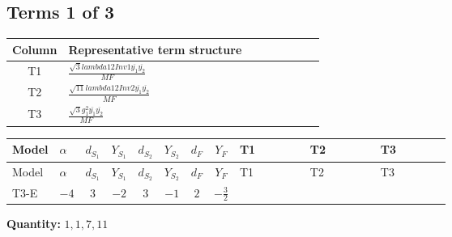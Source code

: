\documentclass[8pt]{article}
\begin{document}
\begin{landscape}
\subsection*{Terms 1 of 3}
\begin{center}
\begin{tabular}{@{}c >{\raggedright\arraybackslash}p{0.82\linewidth}@{}}
\toprule
Column & Representative term structure \\
\midrule
T1 & \(\displaystyle \frac{\sqrt{3} lambda12Inv1 \overline{y_{1}} \overline{y_{2}}}{MF}\) \\
\midrule
T2 & \(\displaystyle \frac{\sqrt{11} lambda12Inv2 \overline{y_{1}} \overline{y_{2}}}{MF}\) \\
\midrule
T3 & \(\displaystyle \frac{\sqrt{3} g_{1}^{2} \overline{y_{1}} \overline{y_{2}}}{MF}\) \\
\midrule
\bottomrule
\end{tabular}
\end{center}
\smallskip
\tiny
\begin{longtable}{@{}llcccccc >{\raggedright\arraybackslash}p{0.21\linewidth} >{\raggedright\arraybackslash}p{0.21\linewidth} >{\raggedright\arraybackslash}p{0.21\linewidth}@{}}
\toprule
Model & $\alpha$ & $d_{S_1}$ & $Y_{S_1}$ & $d_{S_2}$ & $Y_{S_2}$ & $d_F$ & $Y_F$ & T1 & T2 & T3 \\
\midrule
\endfirsthead
\toprule
Model & $\alpha$ & $d_{S_1}$ & $Y_{S_1}$ & $d_{S_2}$ & $Y_{S_2}$ & $d_F$ & $Y_F$ & T1 & T2 & T3 \\
\midrule
\endhead
T3-E & $-4$ & $3$ & $-2$ & $3$ & $-1$ & $2$ & $-\frac{3}{2}$ & \scriptsize\adjustbox{max width=\linewidth}{$\begin{gathered} - \frac{\sqrt{3} lambda12Inv1 \overline{y_{1}} \overline{y_{2}}}{6 MF}\end{gathered}$} & \scriptsize\adjustbox{max width=\linewidth}{$\begin{gathered} \frac{3 \sqrt{11} lambda12Inv2 \overline{y_{1}} \overline{y_{2}}}{22 MF}\end{gathered}$} & \scriptsize\adjustbox{max width=\linewidth}{$\begin{gathered} \frac{9 \sqrt{3} g_{1}^{2} \overline{y_{1}} \overline{y_{2}}}{8 MF}\end{gathered}$} \\
\midrule
\bottomrule
\end{longtable}
\clearpage
\noindent\textbf{Quantity: }$\mathrm{1,1,7,11}$\par\smallskip

\end{landscape}
\end{document}
